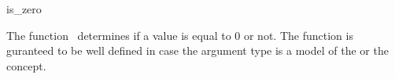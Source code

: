 \begin{ccRefFunction}{is_zero}

\ccDefinition

The function \ccRefName\ determines if a value is equal to 0 or not.
The function is guranteed to be well defined in case the argument type 
is a model of the  or the  concept. 




\ccSeeAlso

\\
\\
\\
\\

\end{ccRefFunction}
